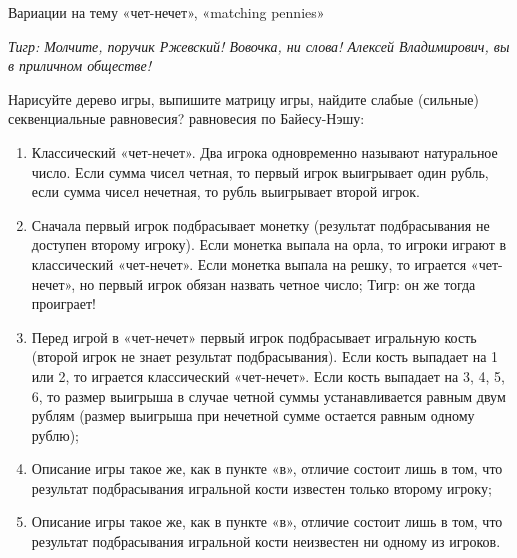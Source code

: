 \begin{problem}
 Вариации на тему «чет-нечет», «matching pennies»\par
{\it Тигр: Молчите, поручик Ржевский!  {\red Вовочка, ни слова! Алексей Владимирович, вы в приличном обществе!}}\par
Нарисуйте дерево игры, выпишите матрицу игры, найдите {\red слабые (сильные) секвенциальные равновесия?}  равновесия по Байесу-Нэшу:\par
\begin{enumerate}
\item Классический «чет-нечет». Два игрока одновременно называют натуральное число. Если сумма чисел четная, то первый игрок выигрывает один рубль, если сумма чисел нечетная, то рубль выигрывает второй игрок.\par
\item Сначала первый игрок подбрасывает монетку (результат подбрасывания не доступен второму игроку). Если монетка выпала на орла, то игроки играют в классический «чет-нечет». Если монетка выпала на решку, то играется «чет-нечет», но первый игрок обязан назвать четное число; {\red Тигр: он же тогда проиграет!}
\item  Перед игрой в «чет-нечет» первый игрок подбрасывает игральную кость (второй игрок не знает результат подбрасывания). Если кость выпадает на 1 или 2, то играется классический «чет-нечет». Если кость выпадает на 3, 4, 5, 6, то размер выигрыша в случае четной суммы устанавливается равным двум рублям (размер выигрыша при нечетной сумме остается равным одному рублю);\par
\item Описание игры такое же, как в пункте «в», отличие состоит лишь в том, что результат подбрасывания игральной кости известен только второму игроку;\par
\item Описание игры такое же, как в пункте «в», отличие состоит лишь в том, что результат подбрасывания игральной кости неизвестен ни одному из игроков.
\end{enumerate}


\begin{sol}

\end{sol}
\end{problem}






